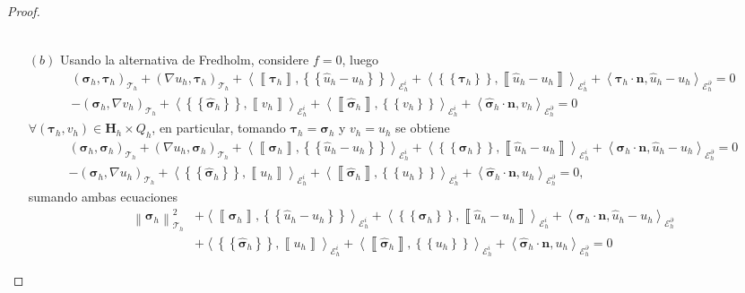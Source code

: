 \documentclass[10pt,a4paper]{report}
\newcommand{\bs}{\boldsymbol}
\newcommand{\Th}{\mathscr{T}_{h}}
\providecommand{\E}[1]{\mathscr{E}^{#1}_{h}}
\providecommand{\norm}[1]{\left\lVert#1\right\rVert}
\providecommand{\salto}[1]{\left\llbracket#1\right\rrbracket}
\providecommand{\prom}[1]{\left \{\!\left \{#1\right \}\!\right \}}
\providecommand{\PI}[2]{\left\langle #1,#2  \right\rangle}
\providecommand{\Pii}[2]{\left( #1,#2  \right)}
\begin{document}
\begin{proof}
\begin{itemize}
\begin{align*}
           \end{align*} 
    \item[$(b)$] Usando la alternativa de Fredholm, considere $f = 0$, luego 
    	\begin{align*}
    		\Pii{\bs{\sigma}_{h}}{\bs{\tau}_{h}}_{\Th} + \Pii{\nabla u_{h}}{\bs{\tau}_{h}}_{\Th} + \PI{\salto{\bs{\tau}_{h}}}{\prom{\hat{u}_{h}-u_{h}}}_{\E{i}} + \PI{\prom{\bs{\tau}_{h}}}{\salto{\hat{u}_{h}-u_{h}}}_{\E{i}} + \PI{\bs{\tau}_{h}\cdot \textbf{n}}{\hat{u}_{h}-u_{h}}_{\E{\partial}} = 0\\
    		-\Pii{\bs{\sigma}_{h}}{\nabla v_{h}}_{\Th} + \PI{\prom{\hat{\bs{\sigma}}_{h}}}{\salto{v_{h}}}_{\E{i}} + \PI{\salto{\hat{\bs{\sigma}}_{h}}}{\prom{v_{h}}}_{\E{i}} + \PI{\hat{\bs{\sigma}}_{h}\cdot \textbf{n}}{v_{h}}_{\E{\partial}} = 0
    	\end{align*}
    	$\forall \Pii{\bs{\tau}_{h}}{v_{h}}\in \textbf{H}_{h}\times Q_{h}$, en particular, tomando $\bs{\tau}_{h} = \bs{\sigma}_{h}$ y $v_{h} = u_{h}$ se obtiene
    	\begin{align*}
    		\Pii{\bs{\sigma}_{h}}{\bs{\sigma}_{h}}_{\Th} + \Pii{\nabla u_{h}}{\bs{\sigma}_{h}}_{\Th} + \PI{\salto{\bs{\sigma}_{h}}}{\prom{\hat{u}_{h}-u_{h}}}_{\E{i}} + \PI{\prom{\bs{\sigma}_{h}}}{\salto{\hat{u}_{h}-u_{h}}}_{\E{i}} + \PI{\bs{\sigma}_{h}\cdot \textbf{n}}{\hat{u}_{h}-u_{h}}_{\E{\partial}} = 0\\
    		-\Pii{\bs{\sigma}_{h}}{\nabla u_{h}}_{\Th} + \PI{\prom{\hat{\bs{\sigma}}_{h}}}{\salto{u_{h}}}_{\E{i}} + \PI{\salto{\hat{\bs{\sigma}}_{h}}}{\prom{u_{h}}}_{\E{i}} + \PI{\hat{\bs{\sigma}}_{h}\cdot \textbf{n}}{u_{h}}_{\E{\partial}} = 0,
    	\end{align*}
    	sumando ambas ecuaciones
    	\begin{align*}
    		\norm{\bs{\sigma}_{h}}^{2}_{\Th} &+ \PI{\salto{\bs{\sigma}_{h}}}{\prom{\hat{u}_{h}-u_{h}}}_{\E{i}} + \PI{\prom{\bs{\sigma}_{h}}}{\salto{\hat{u}_{h}-u_{h}}}_{\E{i}} + \PI{\bs{\sigma}_{h}\cdot \textbf{n}}{\hat{u}_{h}-u_{h}}_{\E{\partial}}\\ &+ \PI{\prom{\hat{\bs{\sigma}}_{h}}}{\salto{u_{h}}}_{\E{i}} + \PI{\salto{\hat{\bs{\sigma}}_{h}}}{\prom{u_{h}}}_{\E{i}} + \PI{\hat{\bs{\sigma}}_{h}\cdot \textbf{n}}{u_{h}}_{\E{\partial}} = 0 
    	\end{align*}
    	
    	
    	
    	
    	
    \end{itemize}
    \end{proof}
\end{document}
